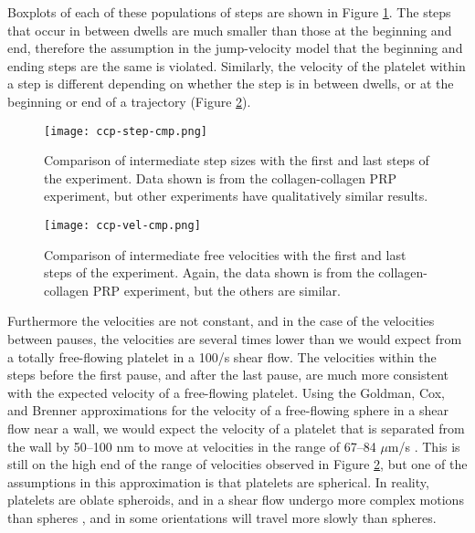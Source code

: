 Boxplots of each of these populations of steps are shown in Figure
\ref{fig:ccp-step-cmp}. The steps that occur in between dwells are
much smaller than those at the beginning and end, therefore the
assumption in the jump-velocity model that the beginning and ending
steps are the same is violated. Similarly, the velocity of the
platelet within a step is different depending on whether the step is
in between dwells, or at the beginning or end of a trajectory (Figure
\ref{fig:ccp-vel-cmp}).


\begin{figure}
  \centering
  \texttt{[image: ccp-step-cmp.png]}
  \caption{Comparison of intermediate step sizes with the first and
    last steps of the experiment. Data shown is from the
    collagen-collagen PRP experiment, but other experiments have
    qualitatively similar results.}
  \label{fig:ccp-step-cmp}
\end{figure}

\begin{figure}
  \centering
  \texttt{[image: ccp-vel-cmp.png]}
  \caption{Comparison of intermediate free velocities with the first
    and last steps of the experiment. Again, the data shown is from
    the collagen-collagen PRP experiment, but the others are similar.}
  \label{fig:ccp-vel-cmp}
\end{figure}

Furthermore the velocities are not constant, and in the case of the
velocities between pauses, the velocities are several times lower than
we would expect from a totally free-flowing platelet in a 100/s shear
flow. The velocities within the steps before the first pause, and
after the last pause, are much more consistent with the expected
velocity of a free-flowing platelet. Using the Goldman, Cox, and
Brenner approximations for the velocity of a free-flowing sphere in a
shear flow near a wall, we would expect the velocity of a platelet
that is separated from the wall by 50--100 nm to move at velocities in
the range of 67--84 $\mu$m/s \cite{Goldman1967a,Goldman1967b}. This is
still on the high end of the range of velocities observed in Figure
\ref{fig:ccp-vel-cmp}, but one of the assumptions in this
approximation is that platelets are spherical. In reality, platelets
are oblate spheroids, and in a shear flow undergo more complex motions
than spheres \cite{Mody2005}, and in some orientations will travel
more slowly than spheres.

